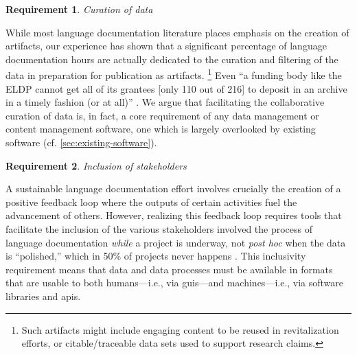 \documentclass[11pt]{article}
\newtheorem{requirement}{Requirement}
\begin{document}
\begin{requirement}
	\label{req:curation}
       Curation of data
\end{requirement}

While most language documentation literature places emphasis on the creation of
artifacts, our experience has shown that a significant percentage of language
documentation hours are actually dedicated to the curation and filtering of the
data in preparation for publication as artifacts.%
\footnote{Such artifacts might include engaging content to be reused in
    revitalization efforts, or citable/traceable data sets used to support
research claims.}
Even ``a funding body like the ELDP cannot get all of its grantees [only 110
out of 216] to deposit in an archive in a timely fashion (or at all)''
\cite{Thieberger:2012}. We argue that
facilitating the collaborative curation of data is, in fact, a core requirement
of any data management or content management software, one which is largely
overlooked by existing software (cf.
\autoref{sec:existing-software}).


\begin{requirement}
	\label{req:inclusive}
       Inclusion of stakeholders
\end{requirement}

A sustainable language documentation effort involves crucially the creation of a
positive feedback loop where the outputs of certain activities fuel
the advancement of others.
However, realizing this feedback loop requires tools that facilitate the
inclusion of the various stakeholders involved the process of language
documentation \emph{while} a project is underway, not \emph{post hoc} when
the data is ``polished,'' which in 50\% of projects never happens
\cite{Thieberger:2012}. This inclusivity requirement means that data and data
processes must be available in formats that are usable to both humans---i.e.,
via \glspl{gui}---and machines---i.e., via software libraries and \glspl{api}.
\end{document}
